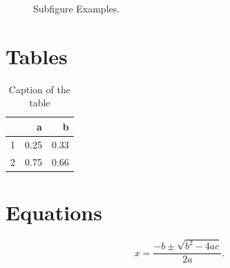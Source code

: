 \begin{figure}[ht]
\centering 
{}
\caption{Subfigure Examples.}
\label{fig:examples}
\end{figure}




\section{Tables}
\begin{table}[ht]
\centering
\begin{tabular}{r|rr}
& a & b\\ 
\hline
1& 0.25 & 0.33\\
2& 0.75 & 0.66\\
\end{tabular}
\caption{Caption of the table}\label{table:example}
\end{table}


\section{Equations}

\begin{equation}
x = \frac{-b \pm \sqrt{b^2-4ac}}{2a}. \label{eq:example}
\end{equation}

